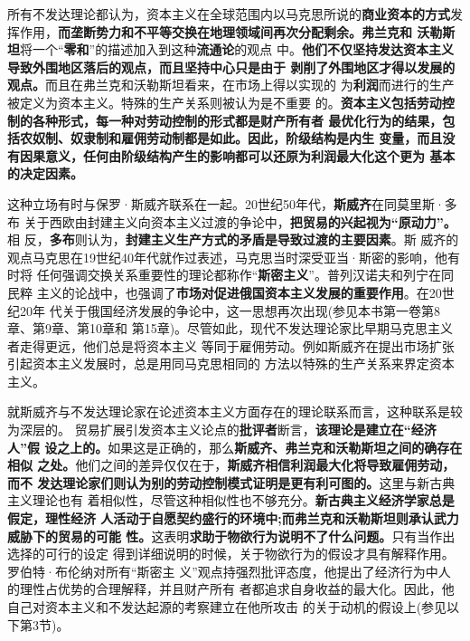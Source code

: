 所有不发达理论都认为，资本主义在全球范围内以马克思所说的\textbf{商业资本的方式}发
挥作用，\textbf{而垄断势力和不平等交换在地理领域间再次分配剩余。}\textbf{弗兰克和
  沃勒斯坦}将一个“\textbf{零和}”的描述加入到这种\textbf{流通论}的观点
中。\textbf{他们不仅坚持发达资本主义导致外围地区落后的观点，而且坚持中心只是由于
  剥削了外围地区才得以发展的观点。}而且在弗兰克和沃勒斯坦看来，在市场上得以实现的
为\textbf{利润}而进行的生产被定义为资本主义。特殊的生产关系则被认为是不重要
的。\textbf{资本主义包括劳动控制的各种形式，每一种对劳动控制的形式都是财产所有者
  最优化行为的结果，包括农奴制、奴隶制和雇佣劳动制都是如此。因此，阶级结构是内生
  变量，而且没有因果意义，任何由阶级结构产生的影响都可以还原为利润最大化这个更为
  基本的决定因素。}

这种立场有时与保罗·斯威齐联系在一起。20世纪50年代，\textbf{斯威齐}在同莫里斯·多布
关于西欧由封建主义向资本主义过渡的争论中，\textbf{把贸易的兴起视为“原动力”。}相
反，\textbf{多布}则认为，\textbf{封建主义生产方式的矛盾是导致过渡的主要因素}。斯
威齐的观点马克思在19世纪40年代就作过表述，马克思当时深受亚当·斯密的影响，他有时将
任何强调交换关系重要性的理论都称作“\textbf{斯密主义}”。普列汉诺夫和列宁在同民粹
主义的论战中，也强调了\textbf{市场对促进俄国资本主义发展的重要作用}。在20世纪20年
代关于俄国经济发展的争论中，这一思想再次出现(参见本书第一卷第8章、第9章、第10章和
第15章)。尽管如此，现代不发达理论家比早期马克思主义者走得更远，他们总是将资本主义
等同于雇佣劳动。例如斯威齐在提出市场扩张引起资本主义发展时，总是用同马克思相同的
方法以特殊的生产关系来界定资本主义。

就斯威齐与不发达理论家在论述资本主义方面存在的理论联系而言，这种联系是较为深层的。
贸易扩展引发资本主义论点的\textbf{批评者}断言，\textbf{该理论是建立在“经济人”假
  设之上的。}如果这是正确的，那么\textbf{斯威齐、弗兰克和沃勒斯坦之间的确存在相似
  之处。}他们之间的差异仅仅在于，\textbf{斯威齐相信利润最大化将导致雇佣劳动，而不
  发达理论家们则认为别的劳动控制模式证明是更有利可图的。}这里与新古典主义理论也有
着相似性，尽管这种相似性也不够充分。\textbf{新古典主义经济学家总是假定，理性经济
  人活动于自愿契约盛行的环境中;而弗兰克和沃勒斯坦则承认武力威胁下的贸易的可能
  性。}这表明\textbf{求助于物欲行为说明不了什么问题。}只有当作出选择的可行的设定
得到详细说明的时候，关于物欲行为的假设才具有解释作用。罗伯特·布伦纳对所有“斯密主
义”观点持强烈批评态度，他提出了经济行为中人的理性占优势的合理解释，并且财产所有
者都追求自身收益的最大化。因此，他自己对资本主义和不发达起源的考察建立在他所攻击
的关于动机的假设上(参见以下第3节)。

